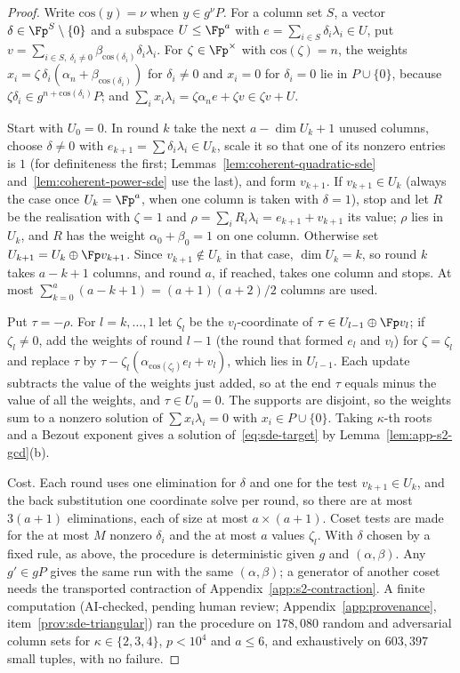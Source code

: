 \begin{proof}
Write $\mathrm{cos}(y)=\nu$ when $y\in g^{\nu}P$. For a column set $S$, a vector $\delta\in\Fp^S\setminus\{0\}$ and a subspace $U\le\Fp^a$ with $e=\sum_{i\in S}\delta_i\lambda_i\in U$, put $v=\sum_{i\in S,\ \delta_i\ne0}\beta_{\mathrm{cos}(\delta_i)}\delta_i\lambda_i$. For $\zeta\in\Fp^\times$ with $\mathrm{cos}(\zeta)=n$, the weights $x_i=\zeta\,\delta_i(\alpha_n+\beta_{\mathrm{cos}(\delta_i)})$ for $\delta_i\ne0$ and $x_i=0$ for $\delta_i=0$ lie in $P\cup\{0\}$, because $\zeta\delta_i\in g^{n+\mathrm{cos}(\delta_i)}P$; and $\sum_i x_i\lambda_i=\zeta\alpha_n e+\zeta v\in \zeta v+U$.

Start with $U_0=0$. In round $k$ take the next $a-\dim U_k+1$ unused columns, choose $\delta\ne 0$ with $e_{k+1}=\sum\delta_i\lambda_i\in U_k$, scale it so that one of its nonzero entries is $1$ (for definiteness the first; Lemmas~\ref{lem:coherent-quadratic-sde} and~\ref{lem:coherent-power-sde} use the last), and form $v_{k+1}$. If $v_{k+1}\in U_k$ (always the case once $U_k=\Fp^a$, when one column is taken with $\delta=1$), stop and let $R$ be the realisation with $\zeta=1$ and $\rho=\sum_iR_i\lambda_i=e_{k+1}+v_{k+1}$ its value; $\rho$ lies in $U_k$, and $R$ has the weight $\alpha_0+\beta_0=1$ on one column. Otherwise set $U_{k+1}=U_k\oplus\Fp v_{k+1}$. Since $v_{k+1}\notin U_k$ in that case, $\dim U_k=k$, so round $k$ takes $a-k+1$ columns, and round $a$, if reached, takes one column and stops. At most $\sum_{k=0}^{a}(a-k+1)=(a+1)(a+2)/2$ columns are used.

Put $\tau=-\rho$. For $l=k,\dots,1$ let $\zeta_l$ be the $v_l$-coordinate of $\tau\in U_{l-1}\oplus\Fp v_l$; if $\zeta_l\neq0$, add the weights of round $l-1$ (the round that formed $e_l$ and $v_l$) for $\zeta=\zeta_l$ and replace $\tau$ by $\tau-\zeta_l(\alpha_{\mathrm{cos}(\zeta_l)}e_l+v_l)$, which lies in $U_{l-1}$. Each update subtracts the value of the weights just added, so at the end $\tau$ equals minus the value of all the weights, and $\tau\in U_0=0$. The supports are disjoint, so the weights sum to a nonzero solution of $\sum x_i\lambda_i=0$ with $x_i\in P\cup\{0\}$. Taking $\kappa$-th roots and a Bezout exponent gives a solution of~\eqref{eq:sde-target} by Lemma~\ref{lem:app-s2-gcd}(b).

Cost. Each round uses one elimination for $\delta$ and one for the test $v_{k+1}\in U_k$, and the back substitution one coordinate solve per round, so there are at most $3(a+1)$ eliminations, each of size at most $a\times(a+1)$. Coset tests are made for the at most $M$ nonzero $\delta_i$ and the at most $a$ values $\zeta_l$. With $\delta$ chosen by a fixed rule, as above, the procedure is deterministic given $g$ and $(\alpha,\beta)$. Any $g'\in gP$ gives the same run with the same $(\alpha,\beta)$; a generator of another coset needs the transported contraction of Appendix~\ref{app:s2-contraction}. A finite computation (AI-checked, pending human review; Appendix~\ref{app:provenance}, item~\ref{prov:sde-triangular}) ran the procedure on $178{,}080$ random and adversarial column sets for $\kappa\in\{2,3,4\}$, $p<10^4$ and $a\le 6$, and exhaustively on $603{,}397$ small tuples, with no failure.
\end{proof}

